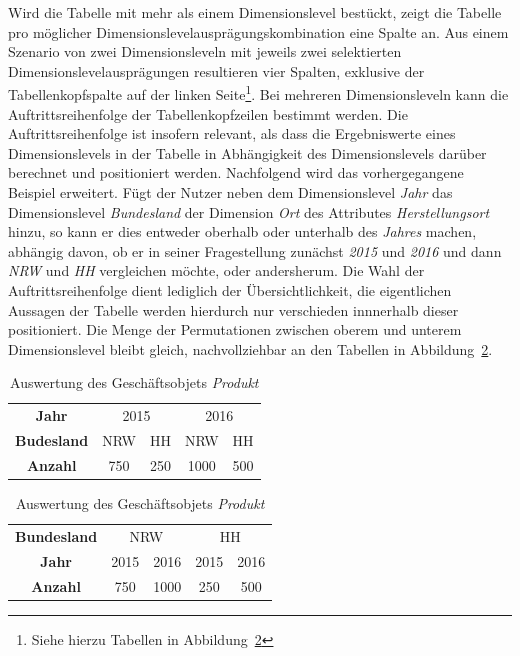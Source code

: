 \documentclass[
  language=german, %
  type=bachelor,%
  ngerman
]{isthesis}
\begin{document}
\begin{content}
  Wird die Tabelle mit mehr als einem Dimensionslevel bestückt, zeigt die
  Tabelle pro möglicher Dimensionslevelausprägungskombination eine Spalte an.
  Aus einem Szenario von zwei Dimensionsleveln mit jeweils zwei selektierten
  Dimensionslevelausprägungen resultieren vier Spalten, exklusive der
  Tabellenkopfspalte auf der linken Seite\footnote{Siehe hierzu Tabellen in
  Abbildung~\ref{table:auftrittsreihenfolge}}. Bei mehreren Dimensionsleveln
  kann die Auftrittsreihenfolge der Tabellenkopfzeilen bestimmt werden. Die
  Auftrittsreihenfolge ist insofern relevant, als dass die Ergebniswerte eines
  Dimensionslevels in der Tabelle in Abhängigkeit des Dimensionslevels darüber
  berechnet und positioniert werden. Nachfolgend wird das vorhergegangene
  Beispiel erweitert. Fügt der Nutzer neben dem Dimensionslevel \textit{Jahr}
  das Dimensionslevel \textit{Bundesland} der Dimension \textit{Ort} des
  Attributes \textit{Herstellungsort} hinzu, so kann er dies entweder oberhalb oder
  unterhalb des \textit{Jahres} machen, abhängig davon, ob er in seiner
  Fragestellung zunächst \textit{2015} und \textit{2016} und dann \textit{NRW}
  und \textit{HH} vergleichen möchte, oder andersherum. Die Wahl der
  Auftrittsreihenfolge dient lediglich der Übersichtlichkeit, die eigentlichen
  Aussagen der Tabelle werden hierdurch nur verschieden innnerhalb dieser positioniert.
  Die Menge der Permutationen zwischen oberem und unterem Dimensionslevel
  bleibt gleich, nachvollziehbar an den Tabellen in
  Abbildung~\ref{table:auftrittsreihenfolge}.
  
  \begin{table}
    \footnotesize
    \begin{tabular}{c c c c c}
      \textbf{Jahr} & \multicolumn{2}{c}{2015} & \multicolumn{2}{c}{2016} \\
      \cmidrule(lr){2-3}\cmidrule(lr){4-5}
      \textbf{Budesland} & NRW & HH & NRW & HH \\
      \toprule
      \textbf{Anzahl} & 750 & 250 & 1000 & 500\\
    \end{tabular}
    \begin{tabular}{c c c c c}
      \textbf{Bundesland} & \multicolumn{2}{c}{NRW} & \multicolumn{2}{c}{HH} \\
      \cmidrule(lr){2-3}\cmidrule(lr){4-5}
      \textbf{Jahr} & 2015 & 2016 & 2015 & 2016 \\
      \toprule
      \textbf{Anzahl} & 750 & 1000 & 250 & 500 \\
    \end{tabular}
    \caption{Auswertung des Geschäftsobjets \textit{Produkt}}\label{table:auftrittsreihenfolge}
  \end{table}


\end{content}
\end{document}
